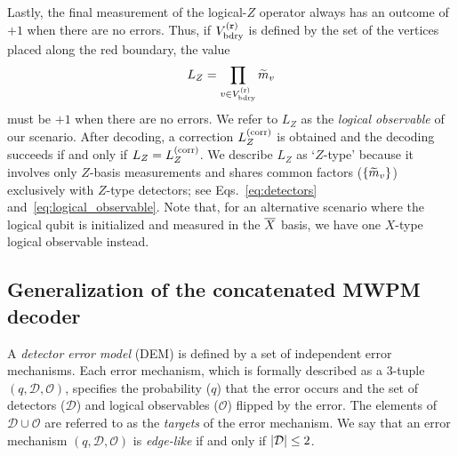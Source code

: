 \documentclass[a4paper,twocolumn,11pt,accepted=2025-01-21]{quantumarticle}
\theoremstyle{definition}
\theoremstyle{definition}
\theoremstyle{definition}
\begin{document}
Lastly, the final measurement of the logical-$Z$ operator always has an outcome of $+1$ when there are no errors.
Thus, if $V_{\mathrm{bdry}}^{(\texttt{r})}$ is defined by the set of the vertices placed along the red boundary, the value
\begin{align}
    L_Z = \prod_{v \in V_{\mathrm{bdry}}^{(\texttt{r})}} \widetilde{m}_{v} \label{eq:logical_observable}
\end{align}
must be $+1$ when there are no errors.
We refer to $L_Z$ as the \emph{logical observable} of our scenario.
After decoding, a correction $L_Z^{(\mathrm{corr})}$ is obtained and the decoding succeeds if and only if $L_Z = L_Z^{(\mathrm{corr})}$.
We describe $L_Z$ as `$Z$-type' because it involves only $Z$-basis measurements and shares common factors ($\qty{\widetilde{m}_{v}}$) exclusively with $Z$-type detectors; see Eqs.~\eqref{eq:detectors} and~\eqref{eq:logical_observable}.
Note that, for an alternative scenario where the logical qubit is initialized and measured in the $\overline{X}$ basis, we have one $X$-type logical observable instead.

\subsection{Generalization of the concatenated MWPM decoder}

A \emph{detector error model} (DEM) is defined by a set of independent error mechanisms.
Each error mechanism, which is formally described as a 3-tuple $(q, \mathcal{D}, \mathcal{O})$, specifies the probability ($q$) that the error occurs and the set of detectors ($\mathcal{D}$) and logical observables ($\mathcal{O}$) flipped by the error.
The elements of $\mathcal{D} \cup \mathcal{O}$ are referred to as the \emph{targets} of the error mechanism.
We say that an error mechanism $(q, \mathcal{D}, \mathcal{O})$ is \emph{edge-like} if and only if $\abs{\mathcal{D}} \leq 2$.
\end{document}
